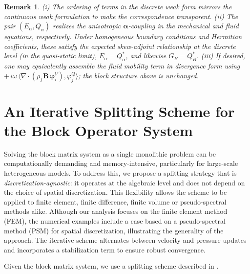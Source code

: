 \documentclass[pdflatex,sn-mathphys-num]{sn-jnl}
\theoremstyle{thmstyleone}%
\theoremstyle{thmstyletwo}%
\newtheorem{remark}{Remark}%
\theoremstyle{thmstylethree}%
\theoremstyle{definition}
\begin{document}
	\noindent
	\begin{remark}
		(i) The ordering of terms in the discrete weak form mirrors the continuous weak formulation to make the correspondence transparent.  
		(ii) The pair $(E_\alpha,Q_\alpha)$ realizes the anisotropic $\boldsymbol{\alpha}$-coupling in the mechanical and fluid equations, respectively. Under homogeneous boundary conditions and Hermitian coefficients, these satisfy the expected skew-adjoint relationship at the discrete level (in the quasi-static limit), $E_\alpha = Q_\alpha^*$, and likewise $G_B = Q_B^*$.  
		(iii) If desired, one may equivalently assemble the fluid mobility term in divergence form using $+\,i\omega\,\langle \nabla\cdot(\rho_f \mathbf{B}\,\boldsymbol{\varphi}_i^V), \varphi_j^Q \rangle$; the block structure above is unchanged.
	\end{remark}
	
	
	
	
	
	\section{An Iterative Splitting Scheme for the Block Operator System}\label{sec: 4}
	
	Solving the block matrix system as a single monolithic problem can be computationally demanding and memory-intensive, particularly for large-scale heterogeneous models. To address this, we propose a splitting strategy that is \emph{discretization-agnostic}: it operates at the algebraic level and does not depend on the choice of spatial discretization. This flexibility allows the scheme to be applied to finite element, finite difference, finite volume or pseudo-spectral methods alike. Although our analysis focuses on the finite element method (FEM), the numerical examples include a case based on a pseudo-spectral method (PSM) for spatial discretization, illustrating the generality of the approach. The iterative scheme alternates between velocity and pressure updates and incorporates a stabilization term to ensure robust convergence.
	
	
	Given the block matrix system, we use a splitting scheme described in . 
	
\end{document}
